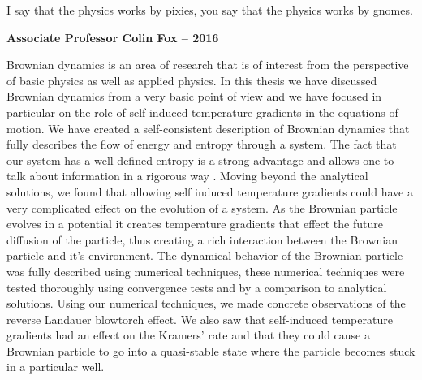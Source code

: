 \epigraph{I say that the physics works by pixies, you say that the physics works by gnomes.}{\textbf{Associate Professor Colin Fox -- 2016}}
Brownian dynamics is an area of research that is of interest from the perspective of basic physics as well as applied physics. In this thesis we have discussed Brownian dynamics from a very basic point of view and we have focused in particular on the role of self-induced temperature gradients in the equations of motion. We have created a self-consistent description of Brownian dynamics that fully describes the flow of energy and entropy through a system. The fact that our system has a well defined entropy is a strong advantage and allows one to talk about information in a rigorous way \cite{Landauer1961,MyersCelebranoKrishnan2015}. Moving beyond the analytical solutions, we found that allowing self induced temperature gradients could have a very complicated effect on the evolution of a system. As the Brownian particle evolves in a potential it creates temperature gradients that effect the future diffusion of the particle, thus creating a rich interaction between the Brownian particle and it's environment. The dynamical behavior of the Brownian particle was fully described using numerical techniques, these numerical techniques were tested thoroughly using convergence tests and by a comparison to analytical solutions. Using our numerical techniques, we made concrete observations of the reverse Landauer blowtorch effect. We also saw that self-induced temperature gradients had an effect on the Kramers' rate and that they could cause a Brownian particle to go into a quasi-stable state where the particle becomes stuck in a particular well.


